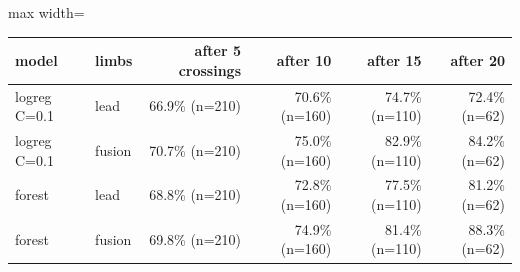 \begin{adjustbox}{max width=\textwidth}
{\footnotesize
\begin{tabular}{llrrrr}
\toprule
\textbf{model} & \textbf{limbs} & \textbf{after 5 crossings} & \textbf{after 10} & \textbf{after 15} & \textbf{after 20} \\
\midrule
logreg C=0.1 & lead & 66.9\% (n=210) & 70.6\% (n=160) & 74.7\% (n=110) & 72.4\% (n=62) \\
logreg C=0.1 & fusion & 70.7\% (n=210) & 75.0\% (n=160) & 82.9\% (n=110) & 84.2\% (n=62) \\
forest & lead & 68.8\% (n=210) & 72.8\% (n=160) & 77.5\% (n=110) & 81.2\% (n=62) \\
forest & fusion & 69.8\% (n=210) & 74.9\% (n=160) & 81.4\% (n=110) & 88.3\% (n=62) \\
\bottomrule
\end{tabular}
}
\end{adjustbox}
